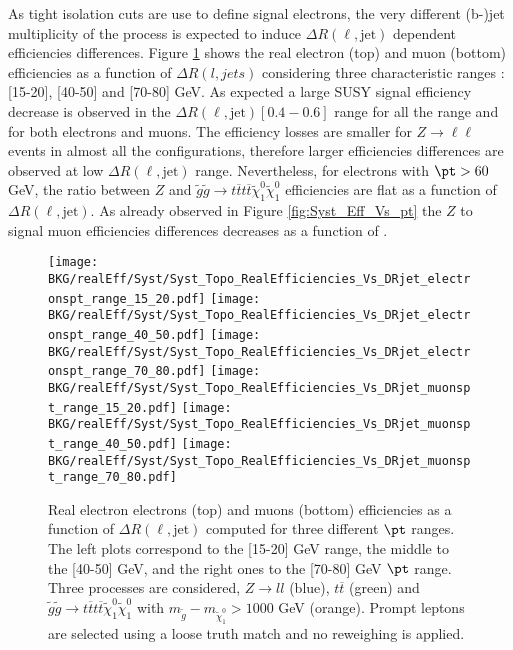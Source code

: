 	As tight isolation cuts are use to define signal electrons, the very different (b-)jet multiplicity of the process is expected to induce $\Delta R(\ell,\mathrm{jet})$ dependent efficiencies differences. Figure \ref{fig:Syst_Eff_Vs_DRjet} shows the real electron (top) and muon (bottom) efficiencies as a function of $\Delta R(l,jets)$ considering three characteristic \pt ranges : [15-20], [40-50] and [70-80] GeV. As expected a large SUSY signal efficiency decrease is observed in the $\Delta R(\ell,\mathrm{jet})[0.4-0.6]$ range for all the \pt range and for both electrons and muons. The efficiency losses are smaller for $Z\rightarrow \ell\ell$ events in almost all the configurations, therefore larger efficiencies differences are observed at low $\Delta R(\ell,\mathrm{jet})$ range. Nevertheless, for electrons with $\pt > 60$ GeV, the ratio between $Z$ and $\tilde{g}\tilde{g} \rightarrow t\overline{t}t\overline{t} \tilde{\chi}^0_1 \tilde{\chi}^0_1$ efficiencies are flat as a function of $\Delta R(\ell,\mathrm{jet})$. As already observed in Figure \ref{fig:Syst_Eff_Vs_pt} the $Z$ to signal muon efficiencies differences decreases as a function of \pt.


\begin{figure}[!h]
	\begin{center} 
	   \texttt{[image: BKG/realEff/Syst/Syst\_Topo\_RealEfficiencies\_Vs\_DRjet\_electronspt\_range\_15\_20.pdf]} 
	   \texttt{[image: BKG/realEff/Syst/Syst\_Topo\_RealEfficiencies\_Vs\_DRjet\_electronspt\_range\_40\_50.pdf]} 
	   \texttt{[image: BKG/realEff/Syst/Syst\_Topo\_RealEfficiencies\_Vs\_DRjet\_electronspt\_range\_70\_80.pdf]}
	   \texttt{[image: BKG/realEff/Syst/Syst\_Topo\_RealEfficiencies\_Vs\_DRjet\_muonspt\_range\_15\_20.pdf]}
	   \texttt{[image: BKG/realEff/Syst/Syst\_Topo\_RealEfficiencies\_Vs\_DRjet\_muonspt\_range\_40\_50.pdf]} 
	   \texttt{[image: BKG/realEff/Syst/Syst\_Topo\_RealEfficiencies\_Vs\_DRjet\_muonspt\_range\_70\_80.pdf]}
	   \caption{\label{fig:Syst_Eff_Vs_DRjet} Real electron electrons (top) and muons (bottom) efficiencies as a function of $\Delta R(\ell,\mathrm{jet})$ computed for three different $\pt$ ranges. The left plots correspond to the [15-20] GeV range, the middle to the [40-50] GeV, and the right ones to the [70-80] GeV $\pt$ range. Three processes are considered, $Z\rightarrow ll$ (blue), $t\overline{t}$ (green) and  $\tilde{g}\tilde{g} \rightarrow t\overline{t}t\overline{t} \tilde{\chi}^0_1 \tilde{\chi}^0_1$ with $m_{\tilde{g}} - m_{\tilde{\chi}^0_1} > 1000$ GeV (orange). Prompt leptons are selected using a loose truth match and no \pt reweighing is applied. }
	\end{center}
\end{figure}	
		
